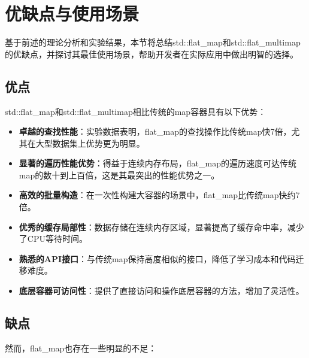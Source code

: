 \documentclass[a4paper, 12pt]{article}
\begin{document}
\section{优缺点与使用场景}

基于前述的理论分析和实验结果，本节将总结std::flat\_map和std::flat\_multimap的优缺点，并探讨其最佳使用场景，帮助开发者在实际应用中做出明智的选择。

\subsection{优点}

std::flat\_map和std::flat\_multimap相比传统的map容器具有以下优势：

\begin{itemize}
    \setlength{\itemsep}{0pt}
    \setlength{\parsep}{0pt}
    \setlength{\parskip}{0pt}
    \item \textbf{卓越的查找性能}：实验数据表明，flat\_map的查找操作比传统map快7倍，尤其在大型数据集上优势更为明显。
    
    \item \textbf{显著的遍历性能优势}：得益于连续内存布局，flat\_map的遍历速度可达传统map的数十到上百倍，这是其最突出的性能优势之一。
    
    \item \textbf{高效的批量构造}：在一次性构建大容器的场景中，flat\_map比传统map快约7倍。
    
    \item \textbf{优秀的缓存局部性}：数据存储在连续内存区域，显著提高了缓存命中率，减少了CPU等待时间。
    
    \item \textbf{熟悉的API接口}：与传统map保持高度相似的接口，降低了学习成本和代码迁移难度。
    
    \item \textbf{底层容器可访问性}：提供了直接访问和操作底层容器的方法，增加了灵活性。
\end{itemize}

\subsection{缺点}

然而，flat\_map也存在一些明显的不足：
\end{document}
